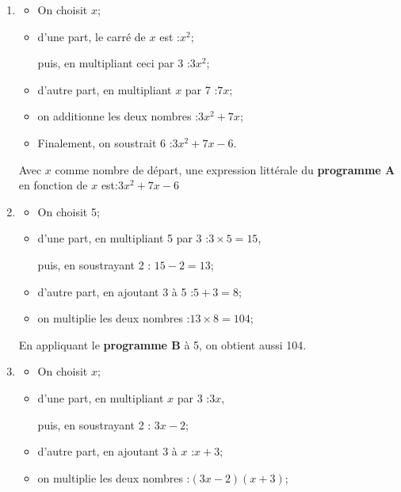 \documentclass[12pt,a4paper,french]{article}
\begin{document}
\begin{enumerate}
	\item \begin{itemize}
		\item On choisit $x$;

		\item d'une part, le carré de $x$ est :\quad $x^2$;

		puis, en multipliant ceci par 3 :\quad $3x^2$;

		\item d'autre part, en multipliant $x$ par 7 :\quad $7x$;

		\item on additionne les deux nombres :\quad $3x^2+7x$;

		\item Finalement, on soustrait 6 :\quad $3x^2+7x-6$.
	\end{itemize}

	Avec $x$ comme nombre de départ, une expression littérale du \textbf{programme A} en fonction de $x$ est:\quad $3x^2+7x-6$

	\item \begin{itemize}
		\item On choisit 5;

		\item d'une part, en multipliant 5 par 3 :\quad $3 \times 5 = 15$,

		puis, en soustrayant 2 : \quad $15 - 2 = 13$;

		\item d'autre part, en ajoutant 3 à 5 :\quad $5+3=8$;

		\item on multiplie les deux nombres :\quad $13 \times 8 = 104$;
	\end{itemize}

	En appliquant le \textbf{programme B} à 5, on obtient aussi 104.

	\item \begin{itemize}
		\item On choisit $x$;

		\item d'une part, en multipliant $x$ par 3 :\quad $3x$,

		puis, en soustrayant 2 : \quad $3x-2$;

		\item d'autre part, en ajoutant 3 à $x$ :\quad $x+3$;

		\item on multiplie les deux nombres :\quad $(3x-2)(x+3)$;
	\end{itemize}


\end{enumerate}
\end{document}
